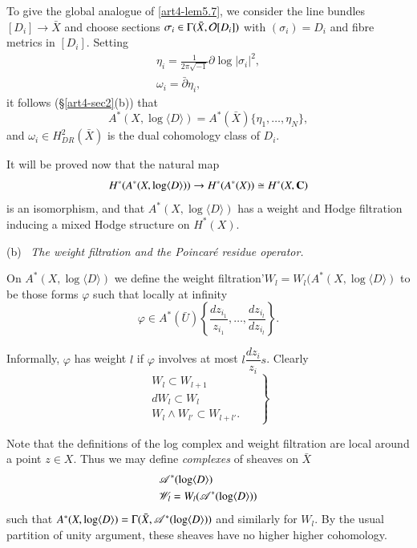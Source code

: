 To give the global analogue of \eqref{art4-lem5.7}, we consider the line bundles $[D_i] \to \bar{X}$ and choose sections $\sigma_i \in \Gamma (\bar{X}, \mathcal{O}[D_i])$ with $(\sigma_i) = D_i$ and fibre metrics in $[D_i]$. Setting
\begin{gather*}
\eta_i = \frac{1}{2\pi \sqrt{-1}} \partial \log |\sigma_i|^2,\\
\omega_i = \bar{\partial} \eta_i,
\end{gather*}
it follows (\cf \S \ref{art4-sec2}(b)) that
\setcounter{equation}{8}
\begin{equation}
A^\ast (X, \log \langle D \rangle) = A^\ast (\bar{X}) \{\eta_1, \ldots , \eta_N\}, \label{art4-eq5.9}
\end{equation}
and $\omega_i \in H^2_{DR} (\bar{X})$ is the dual cohomology class of $D_i$.

It will be proved now that the natural map
$$
H^\ast (A^\ast (X, \log \langle D \rangle)) \to H^\ast (A^\ast (X)) \cong H^\ast (X, \mathbf{C})
$$
is an isomorphism, and that $A^\ast (X, \log \langle D \rangle)$ has a weight and Hodge filtration inducing a mixed Hodge structure on $H^\ast (X)$.

\medskip
\noindent
(b)~ \textit{The weight filtration and the Poincar\'e residue operator.}

\begin{defi*}
On $A^\ast (X, \log \langle D \rangle)$ we define the weight filtration'\break $W_l = W_l (A^\ast (X, \log \langle D \rangle)$  to be those forms $\varphi$ such that locally at infinity
$$
\varphi \in A^\ast (\bar{U}) \left\{\frac{dz_{i_1}}{z_{i_1}}, \ldots, \frac{dz_{i_l}}{dz_{i_l}} \right\}.
$$
\end{defi*}

Informally, $\varphi$ has weight $l$ if $\varphi$ involves at most $l \dfrac{dz_i}{z_i}s$. Clearly
\setcounter{equation}{9}
\begin{equation}
\left. 
\begin{aligned}
W_l \subset W_{l+1} \;\; & \\
dW_l \subset W_l \;\; & \\
W_l \wedge W_{l'} \subset W_{l+l'}. \;\;
\end{aligned}
\right\}\label{art4-eq5.10} 
\end{equation}\pageoriginale

Note that the definitions of the log complex and weight filtration are local around a point $z \in X$. Thus we may define \textit{complexes} of sheaves on $\bar{X}$
\begin{align*}
& \mathscr{A}^\ast (\log \langle D \rangle)\\
& \mathscr{W}_l = W_l (\mathscr{A}^\ast (\log \langle D \rangle))
\end{align*}
such that  $A^\ast (X, \log \langle D \rangle) = \Gamma (\bar{X}, \mathscr{A}^\ast (\log \langle D \rangle))$ and similarly for $W_l$. By the usual partition of unity argument, these sheaves have no higher higher cohomology.

